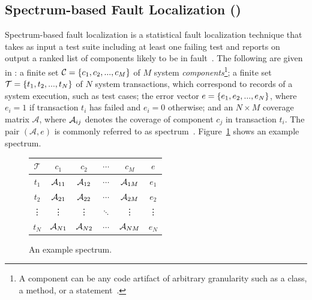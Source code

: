 \documentclass{article}
\begin{document}
\subsection{Spectrum-based Fault Localization (\sfl)}
\label{sec:sfl}

Spectrum-based fault localization is a statistical fault
localization technique that takes as input a test suite including at
least one failing test and reports on output a ranked list of
components likely to be in
fault~\cite{FLSurvey2016,DBLP:conf/kbse/JonesH05,DBLP:journals/smr/LuciaLJTB14,DBLP:journals/jss/AbreuZGG09}. The
following are given in \sfl{}: a finite set $\mathcal{C}=\{{}c_1,c_2,...,c_M\}$ of $M$ system \emph{components}\footnote{A
  component can be any code artifact of arbitrary granularity
  such as a class, a method, or a statement~\cite{DBLP:journals/stvr/HarroldRSWY00}.}; a finite set
$\mathcal{T} = \{{}t_1,t_2,...,t_N\}$ of $N$ system transactions,
which correspond to records of a system execution, such as test cases;
the error vector $e = \{{}e_1,e_2,...,e_N\}$, where $e_i = 1$ if
transaction $t_i$ has failed and $e_i = 0$ otherwise; and an
$N\times{}M$ coverage matrix $\mathcal{A}$, where $\mathcal{A}_{ij}$ denotes the
coverage of component $c_j$ in transaction $t_i$.  The pair
$(\mathcal{A},e)$ is commonly referred to as
spectrum~\cite{DBLP:journals/stvr/HarroldRSWY00}. Figure~\ref{fig:spectrum-example}
shows an example spectrum.
\begin{figure}
  \hspace{-2ex}
  \centering
  \scriptsize
  \begin{tabular}{c|cccc|c}
    $\mathcal{T}$ & $c_1$    & $c_2$    & $\cdots$ & $c_M$    & $e$    \\ \hline
    $t_1$         & $\mathcal{A}_{11}$ & $\mathcal{A}_{12}$ & $\cdots$ & $\mathcal{A}_{1M}$ & $e_1$  \\
    $t_2$         & $\mathcal{A}_{21}$ & $\mathcal{A}_{22}$ & $\cdots$ & $\mathcal{A}_{2M}$ & $e_2$  \\
    \vdots        & \vdots   & \vdots   & $\ddots$ & \vdots   & \vdots \\
    $t_N$         & $\mathcal{A}_{N1}$ & $\mathcal{A}_{N2}$ & $\cdots$ & $\mathcal{A}_{NM}$ & $e_N$  \\
  \end{tabular}
  \caption{An example spectrum.}
  \label{fig:spectrum-example}
\end{figure}
\end{document}
